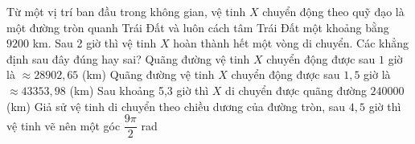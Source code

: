 \begin{ex}%
 Từ một vị trí ban đầu trong không gian, vệ tinh $X$ chuyển động theo quỹ đạo là một đường tròn quanh Trái Đất và luôn cách tâm Trái Đất một khoảng bằng $9200$ km. Sau 2 giờ thì vệ tinh $X$ hoàn thành hết một vòng  di chuyển. Các khẳng định sau đây đúng hay sai?
  \choiceTF
  {\True Quãng đường vệ tinh $X$ chuyển động được sau $1$ giờ là  $\approx 28902{,}65$ (km)}
  {\True Quãng đường vệ tinh $X$ chuyển động được sau  $1{,}5$ giờ là $\approx 43353{,}98$ (km)}
  {Sau khoảng 5,3 giờ thì $X$ di chuyển được  quãng đường $240000$ (km)}
  {\True Giả sử vệ tinh di chuyển theo chiều dương của đường tròn, sau $4{,}5$ giờ thì vệ tinh vẽ nên một góc  $\dfrac{9\pi}{2}$ rad}
\end{ex}

